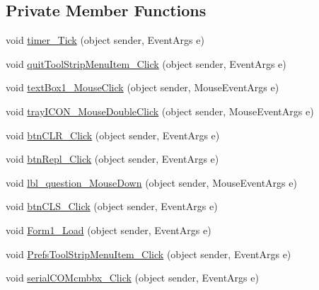 \subsection*{\-Private \-Member \-Functions}
\begin{DoxyCompactItemize}
\item 
void \hyperlink{class_sr_p___classroom_inq_1_1frm_classrrom_inq_a07132b1925da00a6b4673e893f719465}{timer\-\_\-\-Tick} (object sender, \-Event\-Args e)
\item 
void \hyperlink{class_sr_p___classroom_inq_1_1frm_classrrom_inq_a1f6806f1c728c11daf09a988688026d5}{quit\-Tool\-Strip\-Menu\-Item\-\_\-\-Click} (object sender, \-Event\-Args e)
\item 
void \hyperlink{class_sr_p___classroom_inq_1_1frm_classrrom_inq_a6f61cf0772c5333dcd80c6fe143cae2d}{text\-Box1\-\_\-\-Mouse\-Click} (object sender, \-Mouse\-Event\-Args e)
\item 
void \hyperlink{class_sr_p___classroom_inq_1_1frm_classrrom_inq_a7ec6569db6ff275c78bd80bd50646610}{tray\-I\-C\-O\-N\-\_\-\-Mouse\-Double\-Click} (object sender, \-Mouse\-Event\-Args e)
\item 
void \hyperlink{class_sr_p___classroom_inq_1_1frm_classrrom_inq_a5577422488a2959e7e039a95d85506cd}{btn\-C\-L\-R\-\_\-\-Click} (object sender, \-Event\-Args e)
\item 
void \hyperlink{class_sr_p___classroom_inq_1_1frm_classrrom_inq_a65ba92a7bf3839c796abc965f5524b0f}{btn\-Repl\-\_\-\-Click} (object sender, \-Event\-Args e)
\item 
void \hyperlink{class_sr_p___classroom_inq_1_1frm_classrrom_inq_a58eac2c8a22afb14b3090a1cdd73ea1b}{lbl\-\_\-question\-\_\-\-Mouse\-Down} (object sender, \-Mouse\-Event\-Args e)
\item 
void \hyperlink{class_sr_p___classroom_inq_1_1frm_classrrom_inq_a39589edc035bae2c2775afcea57d2798}{btn\-C\-L\-S\-\_\-\-Click} (object sender, \-Event\-Args e)
\item 
void \hyperlink{class_sr_p___classroom_inq_1_1frm_classrrom_inq_ac71625cc47c0a4bfa92bd4f83e8c7bb6}{\-Form1\-\_\-\-Load} (object sender, \-Event\-Args e)
\item 
void \hyperlink{class_sr_p___classroom_inq_1_1frm_classrrom_inq_abce1cb97617c664a4d967eed8c5f9c86}{\-Prefs\-Tool\-Strip\-Menu\-Item\-\_\-\-Click} (object sender, \-Event\-Args e)
\item 
void \hyperlink{class_sr_p___classroom_inq_1_1frm_classrrom_inq_a07401ed0357e442240346cc777bf5acd}{serial\-C\-O\-Mcmbbx\-\_\-\-Click} (object sender, \-Event\-Args e)

\end{DoxyCompactItemize}
